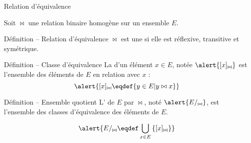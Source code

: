 
\begingroup

\begin{frame}{Relation d'équivalence}

  Soit $\bowtie$ une relation binaire homogène sur un ensemble $E$.
  \begin{block}{Définition -- Relation d'équivalence}
    $\bowtie$ est une  si elle est \alert{réflexive}, \alert{transitive} et \alert{symétrique}.
  \end{block}

  \begin{block}{Définition -- Classe d'équivalence}
    La  d'un élément $x \in E$, notée $\alert{[x]_{\bowtie}}$ est l'ensemble des éléments de $E$ en relation avec $x$ :
    $$\alert{[x]_{\bowtie} \eqdef \{y\in E | y \bowtie x\}}$$
  \end{block}

  \begin{block}{Définition -- Ensemble quotient}
    L' de $E$ par $\bowtie$, noté $\alert{E/_{\bowtie}}$, est l'ensemble des classes d'équivalence des éléments de $E$.

    $$\alert{ E/_{\bowtie} \eqdef \bigcup_{x\in E}\left\{[x]_{\bowtie}\right\}}$$
  \end{block}
\end{frame}

\endgroup
